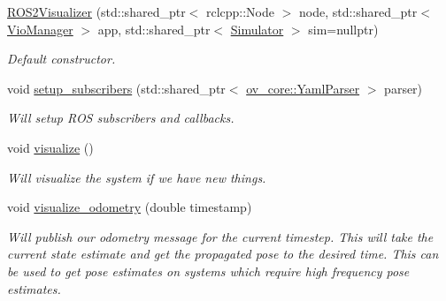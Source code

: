 \begin{DoxyCompactItemize}
\item 
\hyperlink{classov__msckf_1_1ROS2Visualizer_a78a07d5b059b81b009a3c1adac36bc0b}{R\+O\+S2\+Visualizer} (std\+::shared\+\_\+ptr$<$ rclcpp\+::\+Node $>$ node, std\+::shared\+\_\+ptr$<$ \hyperlink{classov__msckf_1_1VioManager}{Vio\+Manager} $>$ app, std\+::shared\+\_\+ptr$<$ \hyperlink{classov__msckf_1_1Simulator}{Simulator} $>$ sim=nullptr)
\begin{DoxyCompactList}\small\item\em Default constructor. \end{DoxyCompactList}\item 
void \hyperlink{classov__msckf_1_1ROS2Visualizer_afa4b0e1730e4fc588a09b3a6ffca55f3}{setup\+\_\+subscribers} (std\+::shared\+\_\+ptr$<$ \hyperlink{classov__core_1_1YamlParser}{ov\+\_\+core\+::\+Yaml\+Parser} $>$ parser)
\begin{DoxyCompactList}\small\item\em Will setup R\+OS subscribers and callbacks. \end{DoxyCompactList}\item 
\mbox{\label{classov__msckf_1_1ROS2Visualizer_a4d8b4b52e84096d9d78fe580b99515f6}} 
void \hyperlink{classov__msckf_1_1ROS2Visualizer_a4d8b4b52e84096d9d78fe580b99515f6}{visualize} ()
\begin{DoxyCompactList}\small\item\em Will visualize the system if we have new things. \end{DoxyCompactList}\item 
\mbox{\label{classov__msckf_1_1ROS2Visualizer_aae1460121f1096401c1fa1a36d9c299b}} 
void \hyperlink{classov__msckf_1_1ROS2Visualizer_aae1460121f1096401c1fa1a36d9c299b}{visualize\+\_\+odometry} (double timestamp)
\begin{DoxyCompactList}\small\item\em Will publish our odometry message for the current timestep. This will take the current state estimate and get the propagated pose to the desired time. This can be used to get pose estimates on systems which require high frequency pose estimates. \end{DoxyCompactList}\item 
\mbox{\label{classov__msckf_1_1ROS2Visualizer_a9126120133a9b4e329c55f0b84c6cf37}} 

\end{DoxyCompactItemize}
